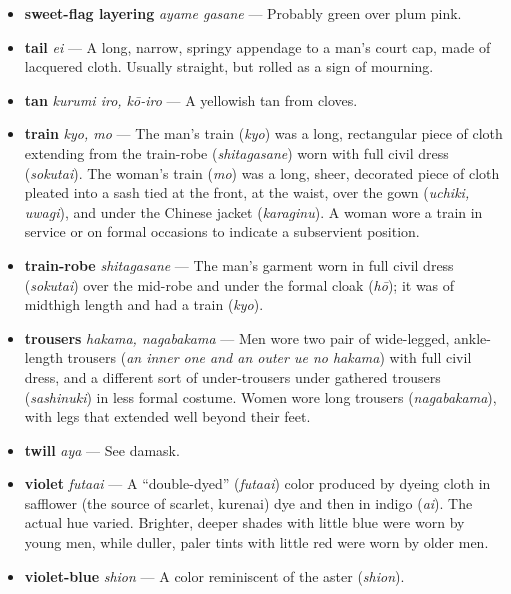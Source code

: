 \documentclass{article}
\begin{document}
\begin{multicols*}{2}
\begin{itemize}[
			label=,
			leftmargin=0em,
			rightmargin=-1.5em,
			itemindent=-2em,
			nosep,
		]
		\item \textbf{sweet-flag layering} \textit{ayame gasane} --- Probably green over plum pink.

		\item \textbf{tail} \textit{ei} --- A long, narrow, springy appendage to a man's court cap, made of lacquered cloth. Usually straight, but rolled as a sign of mourning.

		\item \textbf{tan} \textit{kurumi iro, kō-iro} --- A yellowish tan from cloves.

		\item \textbf{train} \textit{kyo, mo} --- The man's train (\textit{kyo}) was a long, rectangular piece of cloth extending from the train-robe (\textit{shitagasane}) worn with full civil dress (\textit{sokutai}). The woman's train (\textit{mo}) was a long, sheer, decorated piece of cloth pleated into a sash tied at the front, at the waist, over the gown (\textit{uchiki, uwagi}), and under the Chinese jacket (\textit{karaginu}). A woman wore a train in service or on formal occasions to indicate a subservient position.

		\item \textbf{train-robe} \textit{shitagasane} --- The man's garment worn in full civil dress (\textit{sokutai}) over the mid-robe and under the formal cloak (\textit{hō}); it was of midthigh length and had a train (\textit{kyo}).

		\item \textbf{trousers} \textit{hakama, nagabakama} --- Men wore two pair of wide-legged, ankle-length trousers (\textit{an inner one and an outer ue no hakama}) with full civil dress, and a different sort of under-trousers under gathered trousers (\textit{sashinuki}) in less formal costume. Women wore long trousers (\textit{nagabakama}), with legs that extended well beyond their feet.

		\item \textbf{twill} \textit{aya} --- See damask.

		\item \textbf{violet} \textit{futaai} --- A “double-dyed” (\textit{futaai}) color produced by dyeing cloth in safflower (the source of scarlet, kurenai) dye and then in indigo (\textit{ai}). The actual hue varied. Brighter, deeper shades with little blue were worn by young men, while duller, paler tints with little red were worn by older men.

		\item \textbf{violet-blue} \textit{shion} --- A color reminiscent of the aster (\textit{shion}).


\end{itemize}
\end{multicols*}
\end{document}
